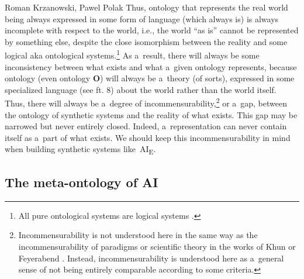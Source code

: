 \begin{artengenv2auth}{Roman Krzanowski, Pawel Polak}
Thus, ontology that represents the real world being always expressed in some form of language (which always is) is always incomplete with respect to the world, i.e., the world ``as is'' cannot be represented by something else, despite the close isomorphism between the reality and some logical aka ontological systems.\footnote{All pure ontological systems are logical systems
\parencites[][p.xiii]{jacquette_ontology_2002}[see e.g.,][]{foschini_where_2013}.%
} As a~result, there will always be some inconsistency between what exists and what a~given ontology represents, because ontology (even ontology \textbf{O}) will always be a~theory (of sorts), expressed in some specialized language (see ft. 8) about the world rather than the world itself. Thus, there will always be a~degree of incommensurability,\footnote{Incommensurability is not understood here in the same way as the incommensurability of paradigms or scientific theory in the works of Khun 
\parencite*[][]{kuhn_structure_1962} %
 or Feyerabend 
\parencites[e.g.,][]{ryan_feyerabend_2002}[for the incommensurability of paradigms, see also][]{sankey_kuhns_1993}[][]{oberheim_incommensurability_2018}[][]{bird_thomas_2000}. %
 Instead, incommensurability is understood here as a~general sense of not being entirely comparable according to some criteria.} or a~gap, between the ontology of synthetic systems and the reality of what exists. This gap may be narrowed but never entirely closed. Indeed, a~representation can never contain itself as a~part of what exists. We should keep this incommensurability in mind when building synthetic systems like~AI\textsubscript{E}.

\subsection*{The meta-ontology of AI}


\end{artengenv2auth}
